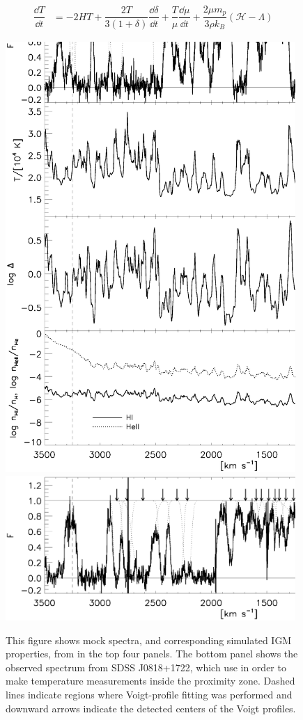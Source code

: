  
\begin{align}
\dfrac{\dd T}{\dd t} &= -2HT + \dfrac{2T}{3(1+\delta)}\dfrac{\dd \delta}{\dd t} + \dfrac{T}{\mu} \dfrac{\dd \mu}{\dd t} + \dfrac{2\mu m_p}{3\rho k_B}(\mathcal{H} - \Lambda) \label{eq:dtdt}
\end{align}

\begin{figure}[h]
  \centering
  \includegraphics[width=11cm]{BoltonIGMTemperature_Fig2.ps}
  \includegraphics[width=11cm]{BoltonIGMTemperature_Fig2b.ps}
  \caption{This figure shows mock spectra, and corresponding simulated IGM properties, from \cite{BoltonQuasar} in the top four panels. The bottom panel shows the observed spectrum from SDSS J0818+1722, which \cite{BoltonQuasar} use in order to make temperature measurements inside the proximity zone. Dashed lines indicate regions where Voigt-profile fitting was performed and downward arrows indicate the detected centers of the Voigt profiles.}
  \label{fig:QuasarProximityTemp}
\end{figure}


